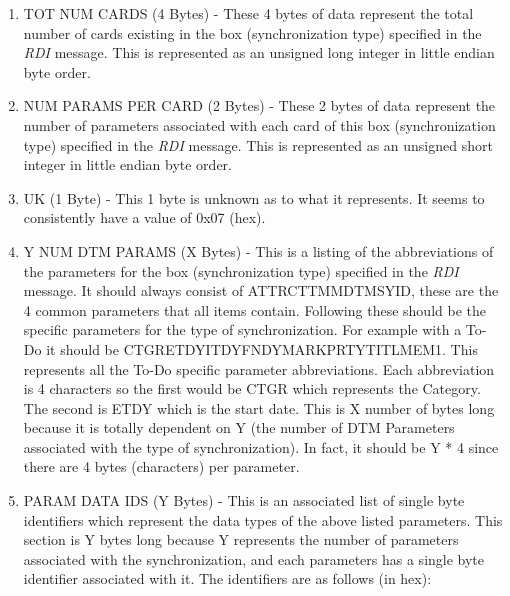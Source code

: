            \begin{enumerate}
              \item TOT NUM CARDS (4 Bytes) - These 4 bytes of data
              represent the total number of cards existing in the box
              (synchronization type) specified in the \emph{RDI} message. This
              is represented as an unsigned long integer in little endian byte
              order.

              \item NUM PARAMS PER CARD (2 Bytes) - These 2 bytes of data
              represent the number of parameters associated with each card of
              this box (synchronization type) specified in the \emph{RDI}
              message. This is represented as an unsigned short integer in
              little endian byte order.

              \item UK (1 Byte) - This 1 byte is unknown as to what it
              represents. It seems to consistently have a value of 0x07 (hex).

              \item Y NUM DTM PARAMS (X Bytes) - This is a listing
              of the abbreviations of the parameters for the box
              (synchronization type) specified in the \emph{RDI} message. It
              should always consist of ATTRCTTMMDTMSYID, these are the 4 common
              parameters that all items contain. Following these should be the
              specific parameters for the type of synchronization. For example
              with a To-Do it should be CTGRETDYITDYFNDYMARKPRTYTITLMEM1. This
              represents all the To-Do  specific parameter abbreviations. Each
              abbreviation is 4 characters so the first would be CTGR which
              represents the Category. The second is ETDY which is the start
              date. This is X number of bytes long because it is totally
              dependent on Y (the number of DTM Parameters associated with the
              type of synchronization). In fact, it should be Y * 4 since
              there are 4 bytes (characters) per parameter.

              \item PARAM DATA IDS (Y Bytes) - This is an associated list of
              single byte identifiers which represent the  data types of the
              above listed parameters. This section is Y bytes long because Y
              represents the number of parameters associated with the
              synchronization, and each parameters has a single byte
              identifier associated with it. The identifiers are as follows
              (in hex):


\end{enumerate}
